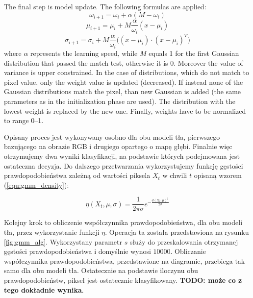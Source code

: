 \documentclass[b5paper,10pt,twoside]{article}
\begin{document}
{The final step is model update. 
The following formulas are applied:
\begin{equation}
\label{equ:w_update}
\omega_{i+1} = \omega_{i} + \alpha(M-\omega_i)
\end{equation}
\begin{equation}
\label{equ:u_update}
\mu_{i+1} = \mu_{i} + M\frac{\alpha}{\omega_i} (x-\mu_i)
\end{equation}
\begin{equation}
\label{equ:s_update}
\sigma_{i+1} = \sigma_{i} + M\frac{\alpha}{\omega_i}\Big( (x-\mu_i) \cdot (x-\mu_i)^T \Big)
\end{equation}
\noindent where $\alpha$ represents the learning speed, while $M$ equals 1 for the first Gaussian distribution that passed the match test, otherwise it is 0. 
Moreover the value of variance is upper constrained. 
In the case of distributions, which do not match to pixel value, only the weight value is updated (decreased). 
If instead none of the Gaussian distributions match the pixel, than new Gaussian is added (the same parameters as in the initialization phase are used). 
The distribution with the lowest weight is replaced by the new one. 
Finally, weights have to be normalized to range 0--1. 

Opisany proces jest wykonywany osobno dla obu modeli tła, pierwszego bazującego na obrazie RGB i drugiego opartego o mapę głębi. Finalnie więc otrzymujemy dwa wyniki klasyfikacji, na podstawie których podejmowana jest ostateczna decyzja. Do dalszego przetwarzania wykorzystujemy funkcję gęstości prawdopodobieństwa zależną od wartości piksela $X_t$ w chwili $t$ opisaną wzorem (\ref{equ:gmm_density}):

    \begin{equation}
        \eta (X_t, \mu, \sigma) = \frac{1}{2\pi\sigma} e^{-\frac{d(X_t, \mu)^2}{2\sigma}} 
    \label{equ:gmm_density}
    \end{equation}

Kolejny krok to obliczenie współczynnika prawdopodobieństwa, dla obu modeli tła, przez wykorzystanie funkcji $\eta$. Operacja ta została przedstawiona na rysunku \ref{fig:gmm_alg}. Wykorzystany parametr $s$ służy do przeskalowania otrzymanej gęstości prawdopodobieństwa i domyślnie wynosi $10000$. Obliczanie współczynnika prawdopodobieństwa, przedstawione na diagramie, przebiega tak samo dla obu modeli tła. Ostatecznie na podstawie iloczynu obu prawdopodobieństw, piksel jest ostatecznie klasyfikowany. \textbf{TODO: może co z tego dokładnie wynika}. 

}
\end{document}
